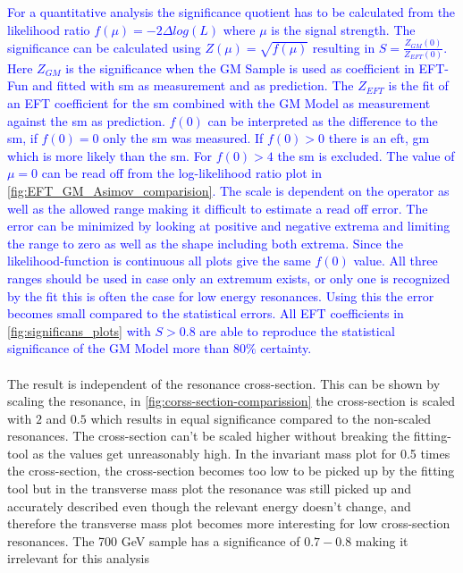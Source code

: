 \documentclass[../Bachelorarbeit.tex]{subfiles}
\begin{document}
\textcolor{blue}{For a quantitative analysis the significance quotient has to be calculated from the likelihood ratio $f(\mu)=-2\Delta log(L)$ where $\mu$ is the signal strength.
    The significance can be calculated using $Z(\mu)=\sqrt{f(\mu)}$ resulting in $S = \frac{Z_{GM}(0)}{Z_{EFT}(0)}$.
    Here $Z_{GM}$ is the significance when the GM Sample is used as coefficient in EFT-Fun and fitted with \acrshort{sm} as measurement and as prediction.
    The $Z_{EFT}$ is the fit of an EFT coefficient for the \acrshort{sm} combined with the GM Model as measurement against the \acrshort{sm} as prediction.
    $f(0)$ can be interpreted as the difference to the \acrshort{sm}, if $f(0) = 0$ only the \acrshort{sm} was measured. If $f(0)>0$ there is an \acrshort{eft}, \acrshort{gm} which is more likely than the \acrshort{sm}. For $f(0) > 4$ the \acrshort{sm} is excluded.
    The value of $\mu=0$ can be read off from the log-likelihood ratio plot in \ref{fig:EFT_GM_Asimov_comparision}. The scale is dependent on
    the operator as well as the allowed range making it difficult to estimate a read off error. The error can be minimized by looking at positive and negative extrema and limiting the range to zero as well as the shape including both extrema.
    Since the likelihood-function is continuous all plots give the same $f(0)$ value. All three ranges should be used in case only an extremum exists, or only one is recognized by the fit this is often the case for low energy resonances.
    Using this the error becomes small compared to the statistical errors. All EFT coefficients in \ref{fig:significans_plots} with $S>0.8$ are able to reproduce the statistical significance of the GM Model more than $80\%$ certainty.}
\\\\
The result is independent of the resonance cross-section. This can be shown by scaling the resonance, in \ref{fig:corss-section-comparission} the cross-section is scaled with $2$ and $0.5$ which results in equal significance compared to the non-scaled resonances.
The cross-section can't be scaled higher without breaking the fitting-tool as the values get unreasonably high. In the invariant mass plot for 0.5 times the cross-section, the cross-section becomes too low to be picked up by the fitting tool but in the transverse mass plot
the resonance was still picked up and accurately described even though the relevant energy doesn't change, and therefore the transverse mass plot becomes more interesting for low cross-section resonances. The 700 GeV sample has a significance of $0.7-0.8$ making it irrelevant for this analysis
\end{document}
